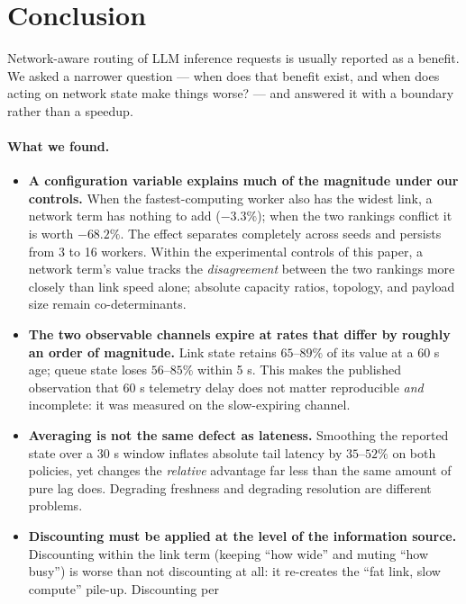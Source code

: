 \section{Conclusion}
\label{sec:conclusion}

Network-aware routing of LLM inference requests is usually reported as a benefit. We asked a
narrower question --- when does that benefit exist, and when does acting on network state make
things worse? --- and answered it with a boundary rather than a speedup.

\paragraph{What we found.}
\begin{itemize}
  \item \textbf{A configuration variable explains much of the magnitude under our controls.}
        When the fastest-computing
        worker also has the widest link, a network term has nothing to add ($-3.3\%$); when the
        two rankings conflict it is worth $-68.2\%$. The effect separates completely across seeds
        and persists from 3 to 16 workers. Within the experimental controls of this paper, a
        network term's value tracks the \emph{disagreement} between the two rankings more closely
        than link speed alone; absolute capacity ratios, topology, and payload size remain
        co-determinants.
  \item \textbf{The two observable channels expire at rates that differ by roughly an order of
        magnitude.} Link state retains $65$--$89\%$ of its value at a 60 s age; queue
        state loses $56$--$85\%$ within 5 s. This makes the published observation
        that 60 s telemetry delay does not matter reproducible \emph{and} incomplete:
        it was measured on the slow-expiring channel.
  \item \textbf{Averaging is not the same defect as lateness.} Smoothing the reported state over
        a 30 s window inflates absolute tail latency by $35$--$52\%$ on both policies,
        yet changes the \emph{relative} advantage far less than the same amount of pure lag does.
        Degrading freshness and degrading resolution are different problems.
  \item \textbf{Discounting must be applied at the level of the information source.} Discounting
        within the link term (keeping ``how wide'' and muting ``how busy'') is worse than not
        discounting at all: it re-creates the ``fat link, slow compute'' pile-up. Discounting per

\end{itemize}
